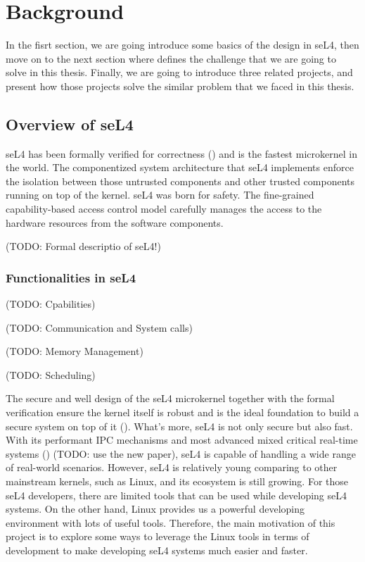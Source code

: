 \chapter{Background}\label{ch:background}

In the fisrt section, we are going introduce some basics of the design in seL4, then move on to the next section where defines the challenge that we are going to solve in this thesis. Finally, we are going to introduce three related projects, and present how those projects solve the similar problem that we faced in this thesis.     

\section{Overview of seL4}

seL4 has been formally verified for correctness (\cite{Klein_EHACDEEKNSTW_09}) and is the fastest microkernel in the world. The componentized system architecture that seL4 implements enforce the isolation between those untrusted components and other trusted components running on top of the kernel. seL4 was born for safety. The fine-grained capability-based access control model carefully manages the access to the hardware resources from the software components. 

(TODO: Formal descriptio of seL4!)
\subsection{Functionalities in seL4}

(TODO: Cpabilities)

(TODO: Communication and System calls)

(TODO: Memory Management)

(TODO: Scheduling)

The secure and well design of the seL4 microkernel together with the formal verification ensure the kernel itself is robust and is the ideal foundation to build a secure system on top of it (\cite{Klein_AEHCDEEKNSTW_10}). What's more, seL4 is not only secure but also fast. With its performant IPC mechanisms and most advanced mixed critical real-time systems (\cite{Lyons_Heiser_14}) (TODO: use the new paper), seL4 is capable of handling a wide range of real-world scenarios. However, seL4 is relatively young comparing to other mainstream kernels, such as Linux, and its ecosystem is still growing. For those seL4 developers, there are limited tools that can be used while developing seL4 systems. On the other hand, Linux provides us a powerful developing environment with lots of useful tools. Therefore, the main motivation of this project is to explore some ways to leverage the Linux tools in terms of development to make developing seL4 systems much easier and faster.

